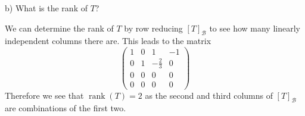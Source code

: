\documentclass[a4paper, 11pt]{article}
\newenvironment{solution}{%
	\begin{list}{}{%
			\setlength{\topsep}{0pt}%
			\setlength{\leftmargin}{1.5cm}%
			\setlength{\rightmargin}{1.5cm}%
			\setlength{\listparindent}{\parindent}%
			\setlength{\itemindent}{\parindent}%
			\setlength{\parsep}{\parskip}%
		}%
		\item[]}{\end{list}}
\begin{document}
\noindent b) What is the rank of $T$?\\
\begin{solution}
  \noindent We can determine the rank of $T$ by row reducing $[T]_\mathcal{B}$ to see how many linearly independent columns there are. This leads to the matrix
  \begin{equation*}
    \begin{pmatrix}
      1 & 0 & 1 & -1 \\
      0 & 1 & -\frac{2}{3} & 0 \\
      0 & 0 & 0 & 0 \\
      0 & 0 & 0 & 0
    \end{pmatrix}
  \end{equation*}
  Therefore we see that $\operatorname{rank}(T) = 2$ as the second and third columns of $[T]_\mathcal{B}$ are combinations of the first two. 
\end{solution}
\end{document}
